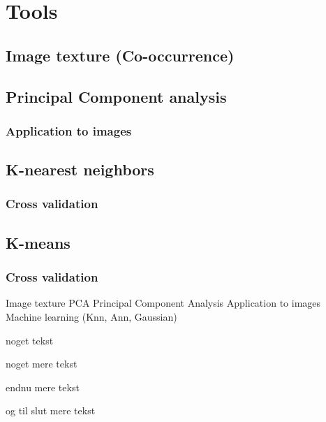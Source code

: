 \chapter{Tools}

\section{Image texture (Co-occurrence)}

\section{Principal Component analysis}

\subsection{Application to images}

\section{K-nearest neighbors}

\subsection{Cross validation}

\section{K-means}

\subsection{Cross validation}



Image texture
PCA
Principal Component Analysis Application to images
Machine learning (Knn, Ann, Gaussian)


\small
noget tekst 

noget mere tekst 

endnu mere tekst 

og til slut mere tekst 
